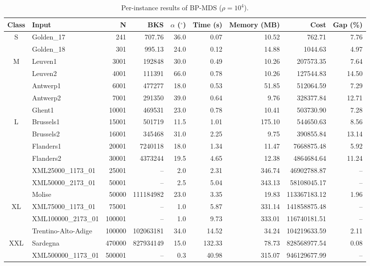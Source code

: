 \begin{table}[t]
\caption{Per-instance results of BP-MDS ($\rho = 10^4$).}
\centering
\small
\begin{tabular}{clrrrrrrr}
\toprule
Class & Input & N & BKS & $\alpha$ ($^\circ$) & Time (s) & Memory (MB) & Cost & Gap (\%)\\
\midrule
\multirow{2}{*}{S}
 & Golden\_17 & 241 & 707.76 & 36.0 & 0.07 & 10.52 & 762.71 & 7.76 \\
 & Golden\_18 & 301 & 995.13 & 24.0 & 0.12 & 14.88 & 1044.63 & 4.97 \\
\midrule
\multirow{5}{*}{M}
 & Leuven1 & 3001 & 192848 & 30.0 & 0.49 & 10.26 & 207573.35 & 7.64 \\
 & Leuven2 & 4001 & 111391 & 66.0 & 0.78 & 10.26 & 127544.83 & 14.50 \\
 & Antwerp1 & 6001 & 477277 & 18.0 & 0.53 & 51.85 & 512064.59 & 7.29 \\
 & Antwerp2 & 7001 & 291350 & 39.0 & 0.64 & 9.76 & 328377.84 & 12.71 \\
 & Ghent1 & 10001 & 469531 & 23.0 & 0.78 & 10.41 & 503730.90 & 7.28 \\
\midrule
\multirow{7}{*}{L}
 & Brussels1 & 15001 & 501719 & 11.5 & 1.01 & 175.10 & 544650.63 & 8.56 \\
 & Brussels2 & 16001 & 345468 & 31.0 & 2.25 & 9.75 & 390855.84 & 13.14 \\
 & Flanders1 & 20001 & 7240118 & 18.0 & 1.34 & 11.47 & 7668875.48 & 5.92 \\
 & Flanders2 & 30001 & 4373244 & 19.5 & 4.65 & 12.38 & 4864684.64 & 11.24 \\
 & XML25000\_1173\_01 & 25001 & -- & 2.0 & 2.31 & 346.74 & 46902788.87 & -- \\
 & XML50000\_2173\_01 & 50001 & -- & 2.5 & 5.04 & 343.13 & 58108045.17 & -- \\
 & Molise & 50000 & 111184982 & 23.0 & 3.35 & 19.83 & 113367183.12 & 1.96 \\
\midrule
\multirow{3}{*}{XL}
 & XML75000\_1173\_01 & 75001 & -- & 1.0 & 5.87 & 331.14 & 141858875.48 & -- \\
 & XML100000\_2173\_01 & 100001 & -- & 1.0 & 9.73 & 333.01 & 116740181.51 & -- \\
 & Trentino-Alto-Adige & 100000 & 102063181 & 34.0 & 14.52 & 34.24 & 104219633.59 & 2.11 \\
\midrule
\multirow{4}{*}{XXL}
 & Sardegna & 470000 & 827934149 & 15.0 & 132.33 & 78.73 & 828568977.54 & 0.08 \\
 & XML500000\_1173\_01 & 500001 & -- & 0.3 & 40.98 & 315.07 & 946129677.99 & -- \\

\end{tabular}
\end{table}
